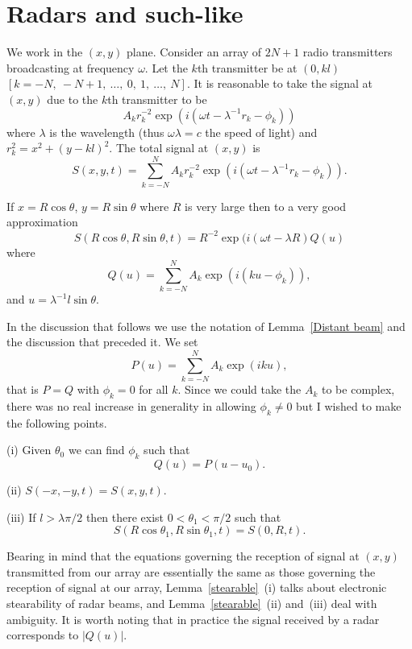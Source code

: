 \section{Radars and such-like} We work in the $(x,y)$ plane.
Consider an array of $2N+1$ radio transmitters broadcasting
at frequency $\omega$. Let the $k$th transmitter be
at $(0,kl)$ $[k=-N,\ -N+1,\ \dots,\ 0,\ 1,\ \dots,\ N]$.
It is reasonable to take the signal at $(x,y)$
due to the $k$th transmitter to be
\[A_{k}r_{k}^{-2}\exp(i(\omega t-\lambda^{-1}r_{k}-\phi_{k}))\]
where $\lambda$ is the wavelength (thus $\omega\lambda=c$
the speed of light)
and $r_{k}^{2}=x^{2}+(y-kl)^{2}$.
The total signal at $(x,y)$ is
\[S(x,y,t)=\sum_{k=-N}^{N}
A_{k}r_{k}^{-2}\exp(i(\omega t-\lambda^{-1}r_{k}-\phi_{k})).\]
\begin{lemma}\label{Distant beam}
If $x=R\cos\theta$, $y=R\sin\theta$ where
$R$ is very large then to a very good approximation
\[S(R\cos\theta,R\sin\theta,t)=R^{-2}\exp(i(\omega t-\lambda R)Q(u)\]
where
\[Q(u)=\sum_{k=-N}^{N}A_{k}\exp(i(ku-\phi_{k})),\]
and $u=\lambda^{-1}l\sin\theta$.
\end{lemma}
In the discussion that follows we use the notation
of Lemma~\ref{Distant beam} and the discussion that
preceded it. We set
\[P(u)=\sum_{k=-N}^{N}A_{k}\exp(iku),\]
that is $P=Q$ with $\phi_{k}=0$ for all $k$.
Since we could take the $A_{k}$
to be complex, there was no real increase
in generality in allowing $\phi_{k}\neq 0$ but
I wished to make the following points.
\begin{lemma}\label{stearable}
(i) Given $\theta_{0}$ we can find
$\phi_{k}$ such that
\[Q(u)=P(u-u_{0}).\]

(ii) $S(-x,-y,t)=S(x,y,t)$.

(iii) If $l>\lambda\pi/2$ then there exist $0<\theta_{1}<\pi/2$
such that
\[S(R\cos\theta_{1},R\sin\theta_{1},t)=S(0,R,t).\]
\end{lemma}

Bearing in mind that the equations governing the reception
of signal at $(x,y)$ transmitted from our array are
essentially the same as those governing the reception
of signal at  our array, Lemma~\ref{stearable}~(i)
talks about electronic stearability of radar beams,
and Lemma~\ref{stearable}~(ii) and~(iii) deal with
ambiguity. It is worth noting that in practice
the signal received by a radar corresponds to $|Q(u)|$.

